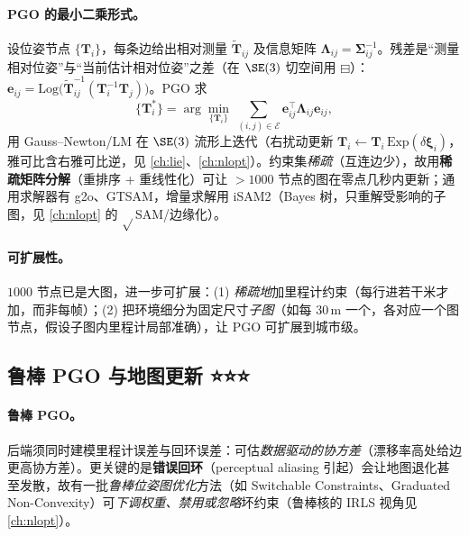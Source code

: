 \paragraph{PGO 的最小二乘形式。}
设位姿节点 $\{\mathbf{T}_i\}$，每条边给出相对测量 $\tilde{\mathbf{T}}_{ij}$ 及信息矩阵 $\boldsymbol{\Lambda}_{ij}=\boldsymbol{\Sigma}_{ij}^{-1}$。残差是“测量相对位姿”与“当前估计相对位姿”之差（在 $\SE(3)$ 切空间用 $\boxminus$）：$\mathbf{e}_{ij}=\mathrm{Log}\big(\tilde{\mathbf{T}}_{ij}^{-1}(\mathbf{T}_i^{-1}\mathbf{T}_j)\big)$。PGO 求
\begin{equation}
  \{\mathbf{T}_i^*\}=\arg\min_{\{\mathbf{T}_i\}}\ \sum_{(i,j)\in\mathcal{E}}\mathbf{e}_{ij}^\top\boldsymbol{\Lambda}_{ij}\mathbf{e}_{ij},
  \label{eq:lidar-pgo}
\end{equation}
用 Gauss–Newton/LM 在 $\SE(3)$ 流形上迭代（右扰动更新 $\mathbf{T}_i\leftarrow\mathbf{T}_i\,\mathrm{Exp}(\delta\boldsymbol{\xi}_i)$，雅可比含右雅可比逆，见 \cref{ch:lie}、\cref{ch:nlopt}）。约束集\emph{稀疏}（互连边少），故用\textbf{稀疏矩阵分解}（重排序 + 重线性化）可让 $>1000$ 节点的图在零点几秒内更新\cite{carlone2026handbook}；通用求解器有 g2o、GTSAM\cite{dellaert2017factor}，增量求解用 iSAM2\cite{kaess2012isam2}（Bayes 树，只重解受影响的子图，见 \cref{ch:nlopt} 的 $\sqrt{}$SAM/边缘化）。

\paragraph{可扩展性。}
$1000$ 节点已是大图，进一步可扩展\cite{carlone2026handbook}：(1) \emph{稀疏地}加里程计约束（每行进若干米才加，而非每帧）；(2) 把环境细分为固定尺寸\emph{子图}（如每 $30$\,m 一个，各对应一个图节点，假设子图内里程计局部准确），让 PGO 可扩展到城市级。

\subsection{鲁棒 PGO 与地图更新 ⭐⭐⭐}
\label{sec:lidar-robust-pgo}

\paragraph{鲁棒 PGO。}
后端须同时建模里程计误差与回环误差\cite{carlone2026handbook}：可估\emph{数据驱动的协方差}（漂移率高处给边更高协方差）。更关键的是\textbf{错误回环}（perceptual aliasing 引起）会让地图退化甚至发散，故有一批\emph{鲁棒位姿图优化}方法（如 Switchable Constraints\cite{sunderhauf2012switchable}、Graduated Non-Convexity\cite{yang2020gnc}）可\emph{下调权重、禁用或忽略}坏约束（鲁棒核的 IRLS 视角见 \cref{ch:nlopt}）。


